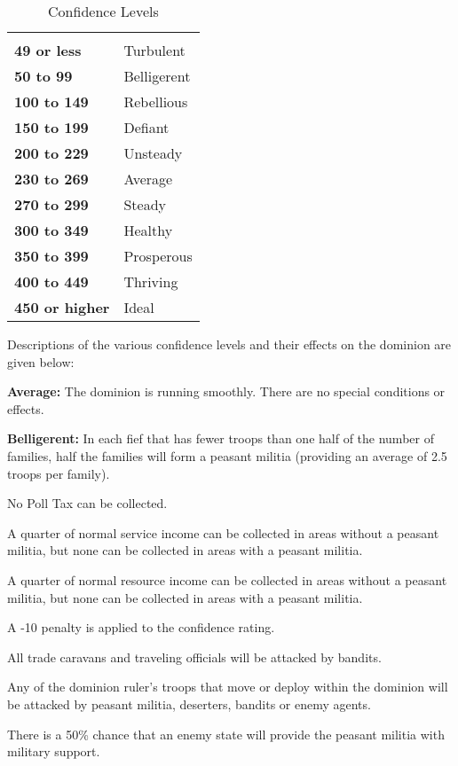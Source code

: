 \begin{multicols*}{2}
\begin {table}[H]
  \caption{Confidence Levels}\label{tab:Confidence Levels}
  \begin{tabularx}{\columnwidth}{>{\bfseries}YY}
	 & \\
	49 or less & Turbulent\\
	50 to 99 & Belligerent\\
	100 to 149 & Rebellious\\
	150 to 199 & Defiant\\
	200 to 229 & Unsteady\\
	230 to 269 & Average\\
	270 to 299 & Steady\\
	300 to 349 & Healthy\\
	350 to 399 & Prosperous\\
	400 to 449 & Thriving\\
	450 or higher & Ideal
  \end {tabularx}
\end {table}

Descriptions of the various confidence levels and their effects on the dominion are given below:

\textbf{Average:} The dominion is running smoothly. There are no special conditions or effects.

\textbf{Belligerent:} In each fief that has fewer troops than one half of the number of families, half the families will form a peasant militia (providing an average of 2.5 troops per family).

No Poll Tax can be collected.

A quarter of normal service income can be collected in areas without a peasant militia, but none can be collected in areas with a peasant militia.

A quarter of normal resource income can be collected in areas without a peasant militia, but none can be collected in areas with a peasant militia.

A -10 penalty is applied to the confidence rating.

All trade caravans and traveling officials will be attacked by bandits.

Any of the dominion ruler’s troops that move or deploy within the dominion will be attacked by peasant militia, deserters, bandits or enemy agents.

There is a 50\% chance that an enemy state will provide the peasant militia with military support.


\end{multicols*}
